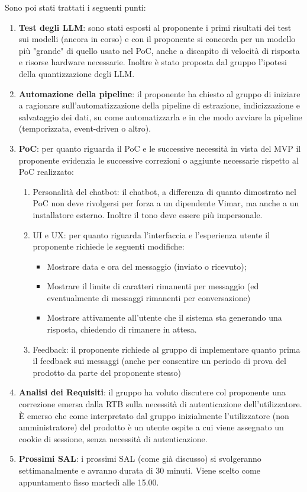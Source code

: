  
\noindent Sono poi stati trattati i seguenti punti:
\begin{enumerate}
    \item \textbf{Test degli LLM}: sono stati esposti al proponente i primi risultati dei test sui modelli (ancora in corso) e con il proponente si concorda per un modello più "grande" di quello usato nel PoC, anche a discapito di velocità di risposta e risorse hardware necessarie. Inoltre è stato proposta dal gruppo l'ipotesi della quantizzazione degli LLM.
    \item \textbf{Automazione della pipeline}: il proponente ha chiesto al gruppo di iniziare a ragionare sull'automatizzazione della pipeline di estrazione, indicizzazione e salvataggio dei dati, su come automatizzarla e in che modo avviare la pipeline (temporizzata, event-driven o altro).
    \item \textbf{PoC}: per quanto riguarda il PoC e le successive necessità in vista del MVP il proponente evidenzia le successive correzioni o aggiunte necessarie rispetto al PoC realizzato:
        \begin{enumerate}
            \item Personalità del chatbot: il chatbot, a differenza di quanto dimostrato nel PoC non deve rivolgersi per forza a un dipendente Vimar, ma anche a un installatore esterno. Inoltre il tono deve essere più impersonale.
            \item UI e UX: per quanto riguarda l'interfaccia e l'esperienza utente il proponente richiede le seguenti modifiche:
                \begin{itemize}
                \item Mostrare data e ora del messaggio (inviato o ricevuto);
                \item Mostrare il limite di caratteri rimanenti per messaggio (ed eventualmente di messaggi rimanenti per conversazione)
                \item Mostrare attivamente all'utente che il sistema sta generando una risposta, chiedendo di rimanere in attesa.
                \end{itemize}
            \item Feedback: il proponente richiede al gruppo di implementare quanto prima il feedback sui messaggi (anche per consentire un periodo di prova del prodotto da parte del proponente stesso)
        \end{enumerate}
    \item \textbf{Analisi dei Requisiti}: il gruppo ha voluto discutere col proponente una correzione emersa dalla RTB sulla necessità di autenticazione dell'utilizzatore. È emerso che come interpretato dal gruppo inizialmente l'utilizzatore (non amministratore) del prodotto è un utente ospite a cui viene assegnato un cookie di sessione, senza necessità di autenticazione.
    \item \textbf{Prossimi SAL}: i prossimi SAL (come già discusso) si svolgeranno settimanalmente e avranno durata di 30 minuti. Viene scelto come appuntamento fisso martedì alle 15.00.
\end{enumerate}
